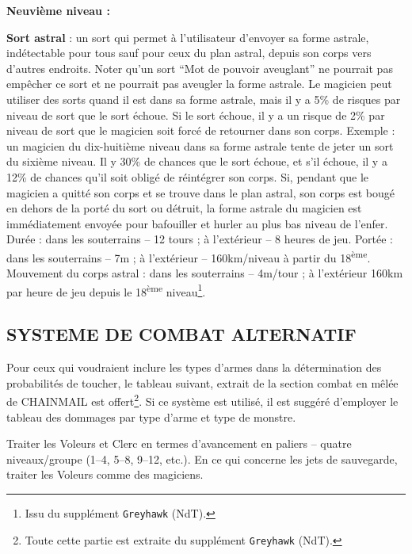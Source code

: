\documentclass[11pt]{article}
\begin{document}
{\bigskip

\textbf{Neuvième niveau :}

\bigskip

\textbf{Sort astral} : un sort qui permet à l'utilisateur d'envoyer sa forme astrale, indétectable pour tous sauf pour ceux du plan astral, depuis son corps vers d'autres endroits. Noter qu'un sort ``Mot de pouvoir aveuglant'' ne pourrait pas empêcher ce sort et ne pourrait pas aveugler la forme astrale. Le magicien peut utiliser des sorts quand il est dans sa forme astrale, mais il y a 5\% de risques par niveau de sort que le sort échoue. Si le sort échoue, il y a un risque de 2\% par niveau de sort que le magicien soit forcé de retourner dans son corps. Exemple : un magicien du dix-huitième niveau dans sa forme astrale tente de jeter un sort du sixième niveau. Il y  30\% de chances que le sort échoue, et s'il échoue, il y a 12\% de chances qu'il soit obligé de réintégrer son corps. Si, pendant que le magicien a quitté son corps et se trouve dans le plan astral, son corps est bougé en dehors de la porté du sort ou détruit, la forme astrale du magicien est immédiatement envoyée pour bafouiller et hurler au plus bas niveau de l'enfer. Durée : dans les souterrains -- 12 tours ; à l'extérieur -- 8 heures de jeu. Portée : dans les souterrains -- 7m ; à l'extérieur -- 160km/niveau à partir du 18\textsuperscript{ème}. Mouvement du corps astral : dans les souterrains -- 4m/tour ; à l'extérieur 160km par heure de jeu depuis le 18\textsuperscript{ème} niveau\footnote{Issu du supplément \texttt{Greyhawk} (NdT).}.

\subsection*{SYSTEME DE COMBAT ALTERNATIF}

Pour ceux qui voudraient inclure les types d'armes dans la détermination des probabilités de toucher, le tableau suivant, extrait de la section \og combat en mêlée \fg{} de CHAINMAIL est offert\footnote{Toute cette partie est extraite du supplément \texttt{Greyhawk} (NdT).}. Si ce système est utilisé, il est suggéré d'employer le tableau des dommages par type d'arme et type de monstre.

Traiter les Voleurs et Clerc en termes d'avancement en paliers -- quatre niveaux/groupe (1--4, 5--8, 9--12, etc.). En ce qui concerne les jets de sauvegarde, traiter les Voleurs comme des magiciens.

\bigskip

}
\end{document}
